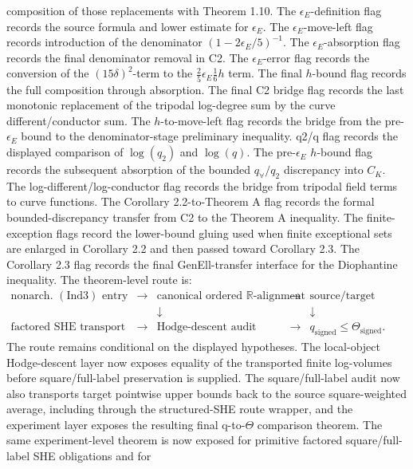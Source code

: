 \documentclass[11pt]{article}
\newcommand{\R}{\mathbb{R}}
\begin{document}
composition of those replacements with Theorem 1.10.  The \(\epsilon_E\)-definition flag
records the source formula and lower estimate for \(\epsilon_E\).  The
\(\epsilon_E\)-move-left flag records introduction of the denominator
\((1-2\epsilon_E/5)^{-1}\).  The \(\epsilon_E\)-absorption flag records the
final denominator removal in C2.  The
\(\epsilon_E\)-error flag records the conversion of the \((15\delta)^2\)-term
to the \(\frac25\epsilon_E\frac16h\) term.
The final \(h\)-bound flag records the full composition through absorption.
The final C2 bridge flag records the last monotonic replacement of the tripodal
log-degree sum by the curve different/conductor sum.
The \(h\)-to-move-left flag records the bridge from the pre-\(\epsilon_E\) bound
to the denominator-stage preliminary inequality.
q2/q flag records the displayed comparison of \(\log(q_2)\) and \(\log(q)\).
The pre-\(\epsilon_E\) \(h\)-bound flag records the subsequent absorption of
the bounded \(q_\forall/q_2\) discrepancy into \(C_K\).
The log-different/log-conductor flag records the bridge from tripodal field
terms to curve functions.  The Corollary 2.2-to-Theorem A flag records the formal
bounded-discrepancy transfer from C2 to the Theorem A inequality.
The finite-exception flags record the lower-bound gluing used when finite
exceptional sets are enlarged in Corollary 2.2 and then passed toward
Corollary 2.3.
The Corollary 2.3 flag records the final GenEll-transfer interface for the
Diophantine inequality.
The theorem-level route is:
\[
\begin{array}{ccccc}
\text{nonarch. }(\mathrm{Ind3})\text{ entry}
& \to &
\text{canonical ordered } \R\text{-alignment}
& \to &
\text{source/target alignment}
\\[3pt]
& & \downarrow & & \downarrow
\\[-2pt]
\text{factored SHE transport}
& \to &
\text{Hodge-descent audit}
& \to &
q_{\mathrm{signed}}\le \Theta_{\mathrm{signed}}.
\end{array}
\]
The route remains conditional on the displayed hypotheses.
The local-object Hodge-descent layer now exposes equality of the transported
finite log-volumes before square/full-label preservation is supplied.
The square/full-label audit now also transports target pointwise upper bounds
back to the source square-weighted average, including through the structured-SHE
route wrapper, and the experiment layer exposes the resulting final
q-to-\(\Theta\) comparison theorem.  The same experiment-level theorem is now
exposed for primitive factored square/full-label SHE obligations and for
\end{document}
